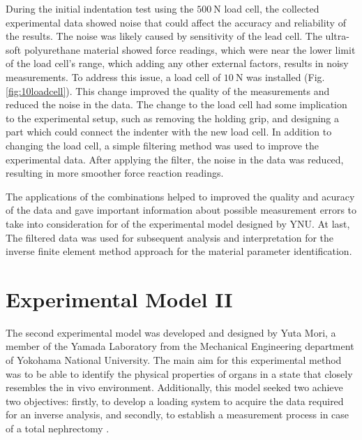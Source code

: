 During the initial indentation test using the $\SI{500}{\newton}$ load cell, 
the collected experimental data showed noise that could affect the accuracy 
and reliability of the results. The noise was likely caused by sensitivity 
of the lead cell. The ultra-soft polyurethane material showed force readings, which 
were near the lower limit of the load cell's range, which adding any other external factors, 
results in noisy measurements. To address this issue, a load cell of $\SI{10}{\newton}$
was installed (Fig. \ref{fig:10loadcell}). This change improved the quality of 
the measurements and reduced the noise in the data. The change to the load cell had some 
implication to the experimental setup, such as removing the holding grip, and designing 
a part which could connect the indenter with the new load cell. In addition to changing 
the load cell, a simple filtering method was used to improve the experimental data. After 
applying the filter, the noise in the data was reduced, resulting in more smoother 
force reaction readings. 

The applications of the combinations helped to improved the quality and acuracy 
of the data and gave important information about possible measurement errors to 
take into consideration for of the experimental model 
designed by YNU. At last, The filtered data was used for subsequent analysis and 
interpretation for the inverse finite element method approach for the material parameter 
identification.


\section{Experimental Model II}
\label{section:expmod2}

The second experimental model was developed and designed by Yuta Mori, a 
member of the Yamada Laboratory from the Mechanical Engineering department of 
 Yokohama National University. 
The main aim for this experimental method was to be able to identify the physical 
properties of organs in a state that closely resembles the in vivo environment.
Additionally, this model seeked two achieve two objectives: firstly, to develop a 
loading system to acquire the data required for an inverse analysis, and secondly, 
to establish a measurement process in case of a total nephrectomy \cite{Mori2022}. 

